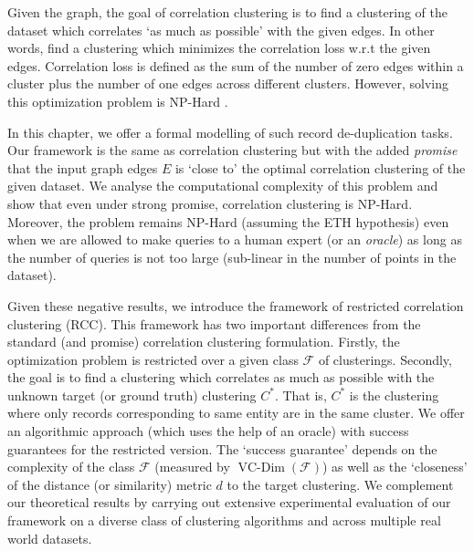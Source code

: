 \documentclass[12pt]{article}
\newcommand{\mc}{\mathcal}
\DeclareMathOperator*{\vcdim}{VC-Dim}
\begin{document}
Given the graph, the goal of correlation clustering is to find a clustering of the dataset which correlates `as much as possible' with the given edges. In other words, find a clustering which minimizes the correlation loss w.r.t the given edges. Correlation loss is defined as the sum of the number of zero edges within a cluster plus the number of one edges across different clusters. However, solving this optimization problem is NP-Hard \cite{bansal2004correlation}. 
  
In this chapter, we offer a formal modelling of such record de-duplication tasks. Our framework is the same as correlation clustering but with the added \textit{promise} that the input graph edges $E$ is `close to' the optimal correlation clustering of the given dataset. We analyse the computational complexity of this problem and show that even under strong promise, correlation clustering is NP-Hard. Moreover, the problem remains NP-Hard (assuming the ETH hypothesis) even when we are allowed to make queries to a human expert (or an \textit{oracle}) as long as the number of queries is not too large (sub-linear in the number of points in the dataset). 

Given these negative results, we introduce the framework of restricted correlation clustering (RCC). This framework has two important differences from the standard (and promise) correlation clustering formulation. Firstly, the optimization problem is restricted over a given class $\mc F$ of clusterings. Secondly, the goal is to find a clustering which correlates as much as possible with the unknown target (or ground truth) clustering $C^*$. That is, $C^*$ is the clustering where only records corresponding to same entity are in the same cluster. We offer an algorithmic approach (which uses the help of an oracle) with success guarantees for the restricted version. The `success guarantee' depends on the complexity of the class $\mc F$ (measured by $\vcdim(\mc F)$) as well as the `closeness' of the distance (or similarity) metric $d$ to the target clustering. We complement our theoretical results by carrying out extensive experimental evaluation of our framework on a diverse class of clustering algorithms and across multiple real world datasets.
\end{document}
